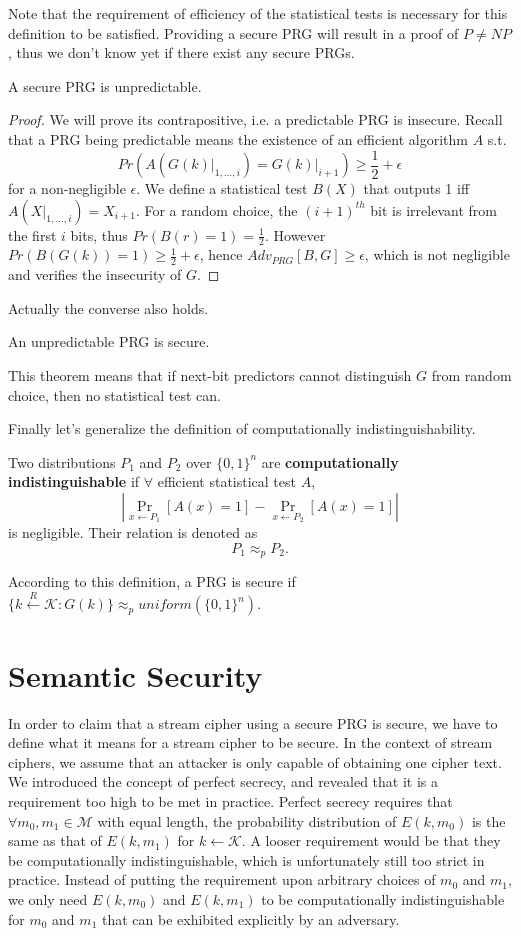 Note that the requirement of efficiency of the statistical tests is necessary for this definition to be satisfied. Providing a secure PRG will result in a proof of $P\neq NP$, thus we don't know yet if there exist any secure PRGs. 
\begin{theorem}
A secure PRG is unpredictable.
\end{theorem}
\begin{proof}
We will prove its contrapositive, i.e. a predictable PRG is insecure. Recall that a PRG being predictable means the existence of an efficient algorithm $A$ s.t.
\begin{equation*}
Pr\left(A\left(\left.G(k)\right\vert_{1,\dots,i}\right)=\left.G(k)\right\vert_{i+1}\right)\geq\frac{1}{2}+\epsilon
\end{equation*}
for a non-negligible $\epsilon$. We define a statistical test $B(X)$ that outputs 1 iff $A(X|_{1,\dots,i})=X_{i+1}$. For a random choice, the $(i+1)^{th}$ bit is irrelevant from the first $i$ bits, thus $Pr(B(r)=1)=\frac{1}{2}.$ However $Pr(B(G(k))=1)\geq \frac{1}{2}+\epsilon$, hence $Adv_{PRG}[B,G]\geq\epsilon$, which is not negligible and verifies the insecurity of $G$.
\end{proof}
Actually the converse also holds.
\begin{theorem}
An unpredictable PRG is secure.
\end{theorem}
This theorem means that if next-bit predictors cannot distinguish $G$ from random choice, then no statistical test can. 

Finally let's generalize the definition of computationally indistinguishability.
\begin{definition}
Two distributions $P_1$ and $P_2$ over $\{0,1\}^n$ are \textbf{computationally indistinguishable} if $\forall$ efficient statistical test $A$, \[\left\lvert\mathop{Pr}\limits_{x\leftarrow P_1}[A(x)=1]-\mathop{Pr}\limits_{x\leftarrow P_2}[A(x)=1]\right\rvert\] is negligible. Their relation is denoted as 
\[P_1\approx_p P_2.\]
\end{definition}
According to this definition, a PRG is secure if $\{k\xleftarrow{R}\mathcal{K}:G(k)\}\approx_p uniform(\{0,1\}^n).$
\section{Semantic Security}
In order to claim that a stream cipher using a secure PRG is secure, we have to define what it means for a stream cipher to be secure. In the context of stream ciphers, we assume that an attacker is only capable of obtaining one cipher text. We introduced the concept of perfect secrecy, and revealed that it is a requirement too high to be met in practice. Perfect secrecy requires that $\forall m_0,m_1\in\mathcal{M}$ with equal length, the probability distribution of $E(k,m_0)$ is the same as that of $E(k,m_1)$ for $k\leftarrow\mathcal{K}$. A looser requirement would be that they be computationally indistinguishable, which is unfortunately still too strict in practice. Instead of putting the requirement upon arbitrary choices of $m_0$ and $m_1$, we only need $E(k,m_0)$ and $E(k,m_1)$ to be computationally indistinguishable for $m_0$ and $m_1$ that can be exhibited explicitly by an adversary. 

